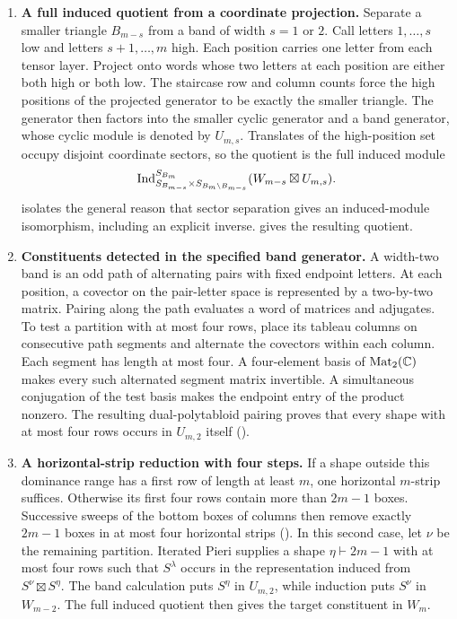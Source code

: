 \begin{enumerate}
\item \textbf{A full induced quotient from a coordinate projection.}
Separate a smaller triangle $B_{m-s}$ from a band of width $s=1$ or $2$.
Call letters $1,\ldots,s$ low and letters $s+1,\ldots,m$ high.
Each position carries one letter from each tensor layer.
Project onto words whose two letters at each position are either both
high or both low. The staircase row and column counts force the high
positions of the projected generator to be exactly the smaller triangle.
The generator then factors into the smaller cyclic generator and a band
generator, whose cyclic module is denoted by $U_{m,s}$.
Translates of the high-position set occupy disjoint
coordinate sectors, so the quotient is the full induced module
\[
\operatorname{Ind}_{S_{B_{m-s}}\times S_{B_m\setminus B_{m-s}}}^{S_{B_m}}
       (W_{m-s}\boxtimes U_{m,s}).
\]
 isolates the general reason that sector
separation gives an induced-module isomorphism, including an explicit
inverse.  gives the resulting quotient.

\item \textbf{Constituents detected in the specified band generator.}
A width-two band is an odd path of alternating pairs with fixed endpoint
letters. At each position, a covector on the pair-letter space is
represented by a two-by-two matrix. Pairing along the path evaluates a word of
matrices and adjugates. To test a partition with at most four rows,
place its tableau columns on consecutive path segments and alternate
the covectors within each column. Each segment has length at most four.
A four-element basis of $\operatorname{Mat}_2(\mathbb C)$ makes every such alternated segment
matrix invertible.
A simultaneous conjugation of the test basis makes the endpoint entry
of the product nonzero. The resulting dual-polytabloid pairing proves
that every shape with at most four rows occurs in $U_{m,2}$ itself
().

\item \textbf{A horizontal-strip reduction with four steps.}
If a shape outside this dominance range has a first row of length at
least $m$, one horizontal $m$-strip suffices. Otherwise its first four
rows contain more than $2m-1$ boxes. Successive sweeps of the bottom
boxes of columns then remove exactly $2m-1$ boxes in at most four
horizontal strips (). In this second case,
let $\nu$ be the remaining partition. Iterated Pieri supplies a shape
$\eta\vdash2m-1$ with at most four rows such that $S^\lambda$ occurs
in the representation induced from $S^\nu\boxtimes S^\eta$.
The band calculation puts $S^\eta$ in $U_{m,2}$, while induction puts
$S^\nu$ in $W_{m-2}$. The full induced quotient then gives the target
constituent in $W_m$.
\end{enumerate}

